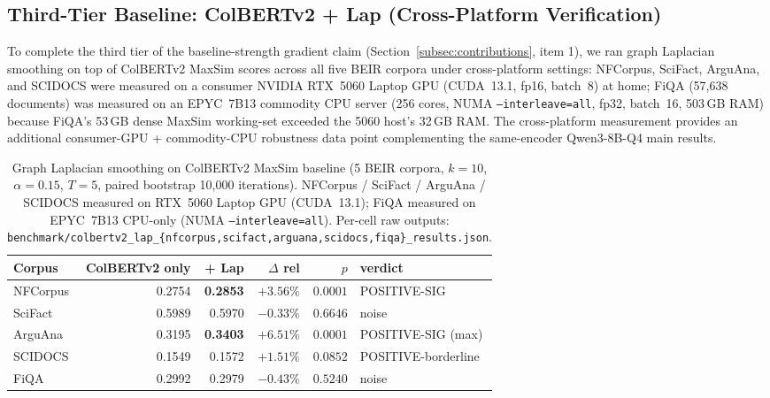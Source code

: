 \documentclass[review,1p]{elsarticle}
\begin{document}
\subsection{Third-Tier Baseline: ColBERTv2 + Lap (Cross-Platform Verification)}
\label{subsec:colbertv2-lap}

To complete the third tier of the baseline-strength gradient claim (Section~\ref{subsec:contributions}, item 1), we ran graph Laplacian smoothing on top of ColBERTv2 MaxSim scores across all five BEIR corpora under cross-platform settings: NFCorpus, SciFact, ArguAna, and SCIDOCS were measured on a consumer NVIDIA RTX~5060 Laptop GPU (CUDA~13.1, fp16, batch~8) at home; FiQA (57{,}638 documents) was measured on an EPYC~7B13 commodity CPU server (256 cores, NUMA \texttt{--interleave=all}, fp32, batch~16, 503\,GB RAM) because FiQA's 53\,GB dense MaxSim working-set exceeded the 5060 host's 32\,GB RAM. The cross-platform measurement provides an additional consumer-GPU + commodity-CPU robustness data point complementing the same-encoder Qwen3-8B-Q4 main results.

\begin{table}[ht]
\centering
\small
\caption{Graph Laplacian smoothing on ColBERTv2 MaxSim baseline (5 BEIR corpora, $k=10$, $\alpha=0.15$, $T=5$, paired bootstrap 10{,}000 iterations). NFCorpus / SciFact / ArguAna / SCIDOCS measured on RTX~5060 Laptop GPU (CUDA~13.1); FiQA measured on EPYC~7B13 CPU-only (NUMA \texttt{--interleave=all}). Per-cell raw outputs: \texttt{benchmark/colbertv2\_lap\_\{nfcorpus,scifact,arguana,scidocs,fiqa\}\_results.json}.}
\label{tab:colbertv2-lap}
\begin{tabular}{lrrrrl}
\toprule
Corpus & ColBERTv2 only & + Lap & $\Delta$ rel & $p$ & verdict \\
\midrule
NFCorpus & 0.2754 & \textbf{0.2853} & $+3.56\%$ & $0.0001$ & POSITIVE-SIG \\
SciFact & 0.5989 & 0.5970 & $-0.33\%$ & $0.6646$ & noise \\
ArguAna & 0.3195 & \textbf{0.3403} & $+6.51\%$ & $0.0001$ & POSITIVE-SIG (max) \\
SCIDOCS & 0.1549 & 0.1572 & $+1.51\%$ & $0.0852$ & POSITIVE-borderline \\
FiQA & 0.2992 & 0.2979 & $-0.43\%$ & $0.5240$ & noise \\
\bottomrule
\end{tabular}
\end{table}
\end{document}

